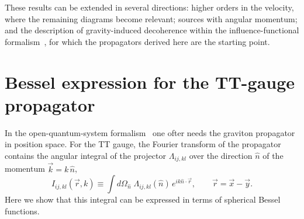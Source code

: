 \documentclass[12pt,a4paper,oneside]{article}
\numberwithin{equation}{section}   %
\begin{document}
These results can be extended in several directions: higher orders in the
velocity, where the remaining diagrams become relevant; sources with angular
momentum; and the description of gravity-induced decoherence within the
influence-functional formalism~\cite{CalzettaHu2008,Blencowe2013}, for which the propagators derived here are the
starting point.

 \newpage
\appendix

\section{Bessel expression for the TT-gauge propagator}
\label{app:bessel}

In the open-quantum-system formalism~\cite{CalzettaHu2008,GundhiBassi2023} one ofter needs the graviton propagator in
position space. For the TT gauge, the Fourier transform of the propagator
contains the angular integral of the projector $\Lambda_{ij,kl}$ over the
direction $\hat n$ of the momentum $\vec k=k\,\hat n$,
\begin{equation}
I_{ij,kl}(\vec r,k) \equiv \int d\Omega_{\hat n}\;\Lambda_{ij,kl}(\hat n)\,
e^{ik\hat n\cdot\vec r},
\qquad \vec r=\vec x-\vec y .
\label{eq:I-def}
\end{equation}
Here we show that this integral can be expressed in terms of spherical Bessel
functions.
\end{document}
